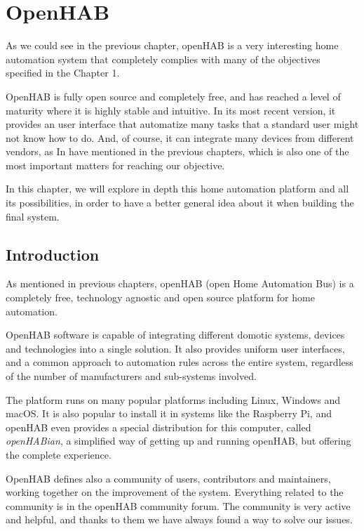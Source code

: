 \chapter{OpenHAB}

As we could see in the previous chapter, openHAB is a very interesting home automation system that completely complies with many 
of the objectives specified in the Chapter 1.

OpenHAB is fully open source and completely free, and has reached a level of maturity where it is highly stable and intuitive. In its
most recent version, it provides an user interface that automatize many tasks that a standard user might not know how to do. And,
of course, it can integrate many devices from different vendors, as In have mentioned in the previous chapters, which is also one of
the most important matters for reaching our objective.

In this chapter, we will explore in depth this home automation platform and all its possibilities, in order to have a better general idea
about it when building the final system.

\section{Introduction}
As mentioned in previous chapters, openHAB (open Home Automation Bus) is a completely free, technology agnostic and open
source platform for home automation.

OpenHAB software is capable of integrating different domotic systems, devices and technologies into a single solution. It also
provides uniform user interfaces, and a common approach to automation rules across the entire system, regardless of the number
of manufacturers and sub-systems involved.\cite{openHABDocs}

The platform runs on many popular platforms including Linux, Windows and macOS. It is also popular to install it in systems like the
Raspberry Pi, and openHAB even provides a special distribution for this computer, called \textit{openHABian}, a simplified way of
getting up and running openHAB, but offering the complete experience.

OpenHAB defines also a community of users, contributors and maintainers, working together on the improvement of the system.
Everything related to the community is in the openHAB community forum. The community is very active and helpful, and thanks
to them we have always found a way to solve our issues.


